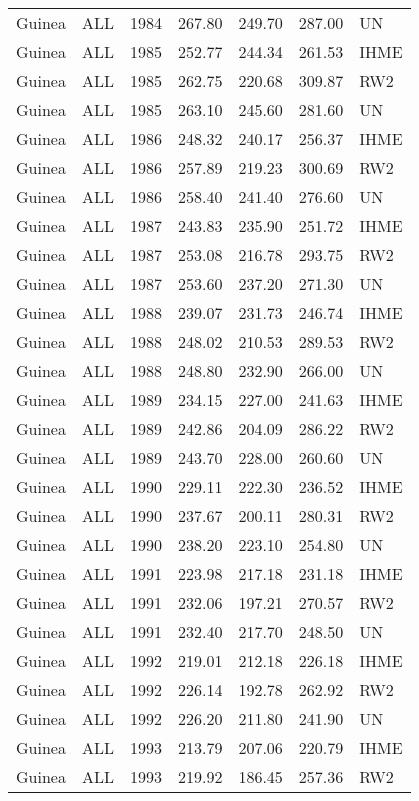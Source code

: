 \begin{longtable}{lllrrrl}
  Guinea & ALL & 1984 & 267.80 & 249.70 & 287.00 & UN \\ 
  Guinea & ALL & 1985 & 252.77 & 244.34 & 261.53 & IHME \\ 
  Guinea & ALL & 1985 & 262.75 & 220.68 & 309.87 & RW2 \\ 
  Guinea & ALL & 1985 & 263.10 & 245.60 & 281.60 & UN \\ 
  Guinea & ALL & 1986 & 248.32 & 240.17 & 256.37 & IHME \\ 
  Guinea & ALL & 1986 & 257.89 & 219.23 & 300.69 & RW2 \\ 
  Guinea & ALL & 1986 & 258.40 & 241.40 & 276.60 & UN \\ 
  Guinea & ALL & 1987 & 243.83 & 235.90 & 251.72 & IHME \\ 
  Guinea & ALL & 1987 & 253.08 & 216.78 & 293.75 & RW2 \\ 
  Guinea & ALL & 1987 & 253.60 & 237.20 & 271.30 & UN \\ 
  Guinea & ALL & 1988 & 239.07 & 231.73 & 246.74 & IHME \\ 
  Guinea & ALL & 1988 & 248.02 & 210.53 & 289.53 & RW2 \\ 
  Guinea & ALL & 1988 & 248.80 & 232.90 & 266.00 & UN \\ 
  Guinea & ALL & 1989 & 234.15 & 227.00 & 241.63 & IHME \\ 
  Guinea & ALL & 1989 & 242.86 & 204.09 & 286.22 & RW2 \\ 
  Guinea & ALL & 1989 & 243.70 & 228.00 & 260.60 & UN \\ 
  Guinea & ALL & 1990 & 229.11 & 222.30 & 236.52 & IHME \\ 
  Guinea & ALL & 1990 & 237.67 & 200.11 & 280.31 & RW2 \\ 
  Guinea & ALL & 1990 & 238.20 & 223.10 & 254.80 & UN \\ 
  Guinea & ALL & 1991 & 223.98 & 217.18 & 231.18 & IHME \\ 
  Guinea & ALL & 1991 & 232.06 & 197.21 & 270.57 & RW2 \\ 
  Guinea & ALL & 1991 & 232.40 & 217.70 & 248.50 & UN \\ 
  Guinea & ALL & 1992 & 219.01 & 212.18 & 226.18 & IHME \\ 
  Guinea & ALL & 1992 & 226.14 & 192.78 & 262.92 & RW2 \\ 
  Guinea & ALL & 1992 & 226.20 & 211.80 & 241.90 & UN \\ 
  Guinea & ALL & 1993 & 213.79 & 207.06 & 220.79 & IHME \\ 
  Guinea & ALL & 1993 & 219.92 & 186.45 & 257.36 & RW2 \\ 

\end{longtable}
